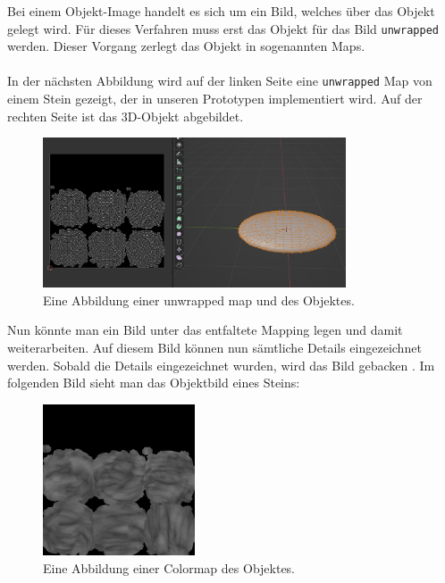 Bei einem Objekt-Image handelt es sich um ein Bild, welches über das Objekt gelegt wird. Für dieses Verfahren muss erst das Objekt für das Bild \verb+unwrapped+ werden. Dieser Vorgang zerlegt das Objekt in sogenannten Maps.\\\\
In der nächsten Abbildung wird auf der linken Seite eine \verb+unwrapped+ Map von einem Stein gezeigt, der in unseren Prototypen implementiert wird. Auf der rechten Seite ist das 3D-Objekt abgebildet.


\begin{figure}[H]
    \centering
    \includegraphics[width=0.8\textwidth]{chapters/11/Images/StoneAndUnwrap.png}
    \caption{Eine Abbildung einer unwrapped map und des Objektes.}
    \label{htl01}
\end{figure}

\noindent Nun könnte man ein Bild unter das entfaltete Mapping legen und damit weiterarbeiten. Auf diesem Bild können nun sämtliche Details eingezeichnet werden. Sobald die Details eingezeichnet wurden, wird das Bild \glqq gebacken \grqq. Im folgenden Bild sieht man das Objektbild eines Steins: 

\begin{figure}[H]
    \centering
    \includegraphics[width=0.4\textwidth]{chapters/11/Images/SteinColor.png}
    \caption{Eine Abbildung einer Colormap des Objektes.}
    \label{htl01}
\end{figure}

